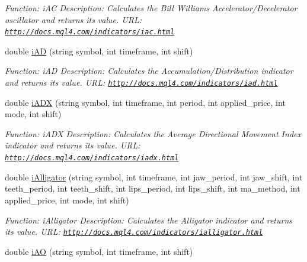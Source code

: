 \begin{DoxyCompactItemize}
\begin{DoxyCompactList}\small\item\em Function\+: i\+AC Description\+: Calculates the Bill Williams\textquotesingle{} Accelerator/\+Decelerator oscillator and returns its value. U\+RL\+: \href{http://docs.mql4.com/indicators/iac.html}{\tt http\+://docs.\+mql4.\+com/indicators/iac.\+html} \end{DoxyCompactList}\item 
double \hyperlink{class_m_q_l4_c_sharp_1_1_base_1_1_m_q_l_base_a14fac8d44d904147df4d90ab41a5d72f}{i\+AD} (string symbol, int timeframe, int shift)
\begin{DoxyCompactList}\small\item\em Function\+: i\+AD Description\+: Calculates the Accumulation/\+Distribution indicator and returns its value. U\+RL\+: \href{http://docs.mql4.com/indicators/iad.html}{\tt http\+://docs.\+mql4.\+com/indicators/iad.\+html} \end{DoxyCompactList}\item 
double \hyperlink{class_m_q_l4_c_sharp_1_1_base_1_1_m_q_l_base_ac14b7ca3aa077fbed6895936e6d1f0ad}{i\+A\+DX} (string symbol, int timeframe, int period, int applied\+\_\+price, int mode, int shift)
\begin{DoxyCompactList}\small\item\em Function\+: i\+A\+DX Description\+: Calculates the Average Directional Movement Index indicator and returns its value. U\+RL\+: \href{http://docs.mql4.com/indicators/iadx.html}{\tt http\+://docs.\+mql4.\+com/indicators/iadx.\+html} \end{DoxyCompactList}\item 
double \hyperlink{class_m_q_l4_c_sharp_1_1_base_1_1_m_q_l_base_a9125ef5210ac2f341876ace6ba0a095a}{i\+Alligator} (string symbol, int timeframe, int jaw\+\_\+period, int jaw\+\_\+shift, int teeth\+\_\+period, int teeth\+\_\+shift, int lips\+\_\+period, int lips\+\_\+shift, int ma\+\_\+method, int applied\+\_\+price, int mode, int shift)
\begin{DoxyCompactList}\small\item\em Function\+: i\+Alligator Description\+: Calculates the Alligator indicator and returns its value. U\+RL\+: \href{http://docs.mql4.com/indicators/ialligator.html}{\tt http\+://docs.\+mql4.\+com/indicators/ialligator.\+html} \end{DoxyCompactList}\item 
double \hyperlink{class_m_q_l4_c_sharp_1_1_base_1_1_m_q_l_base_a7ceac4c405b97ce7f05e562e544c5889}{i\+AO} (string symbol, int timeframe, int shift)

\end{DoxyCompactItemize}
